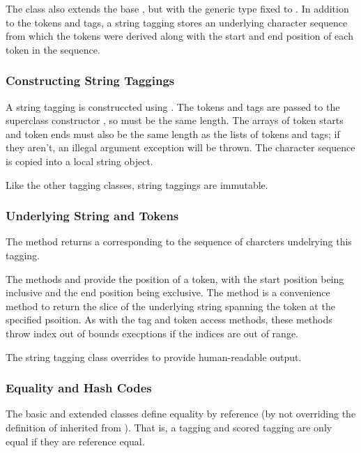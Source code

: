 The class  also extends the base
, but with the generic type  fixed to
.  In addition to the tokens and tags, a string tagging
stores an underlying character sequence from which the tokens were
derived along with the start and end position of each token in the
sequence.  

\subsubsection{Constructing String Taggings}

A string tagging is construccted using
.  The tokens and tags are
passed to the superclass constructor
, so must be the same length.
The arrays of token starts and token ends must also be the same length
as the lists of tokens and tags; if they aren't, an illegal argument
exception will be thrown.  The character sequence is copied into a
local string object.

Like the other tagging classes, string taggings are immutable.

\subsubsection{Underlying String and Tokens}

The method  returns a 
corresponding to the sequence of charcters undelrying this tagging.

The methods  and  provide
the position of a token, with the start position being inclusive and
the end position being exclusive.  The method  is
a convenience method to return the slice of the underlying string
spanning the token at the specified psoition.  As with the tag and
token access methods, these methods throw index out of bounds
execptions if the indices are out of range.

The string tagging class overrides  to provide
human-readable output.


\subsubsection{Equality and Hash Codes}

The basic  and extended  classes
define equality by reference (by not overriding the definition of
 inherited from ).  That
is, a tagging and scored tagging are only equal if they are reference
equal.  

